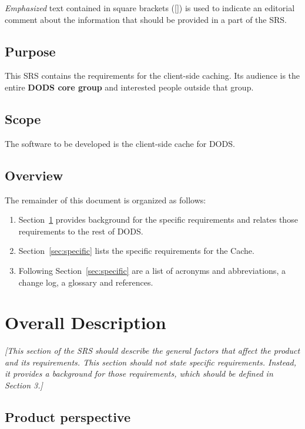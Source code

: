 \documentclass{article}
\begin{document}
\emph{Emphasized} text contained in square brackets ([]) is used to indicate
an editorial comment about the information that should be provided in a part
of the \ac{SRS}.

\subsection{Purpose}
This \ac{SRS} contains the requirements for the client-side caching. Its
audience is the entire \textbf{DODS core group}
and interested people outside that group.

\subsection{Scope}
The software to be developed is the client-side cache for \acs{DODS}.

\subsection{Overview}

The remainder of this document is organized as follows:
\begin{enumerate}
\item Section~\ref{sec:overall} provides background for the specific
requirements and relates those requirements to the rest of DODS.
\item Section~\ref{sec:specific} lists the specific requirements for the
  Cache.
\item Following Section~\ref{sec:specific} are a list of acronyms and
  abbreviations, a change log, a glossary and references.
\end{enumerate}

\section{Overall Description}
\label{sec:overall}

\emph{[This section of the SRS should describe the general factors that
  affect the product and its requirements. This section should not state
  specific requirements. Instead, it provides a background for those
  requirements, which should be defined in Section 3.]}

\subsection{Product perspective}
\end{document}
